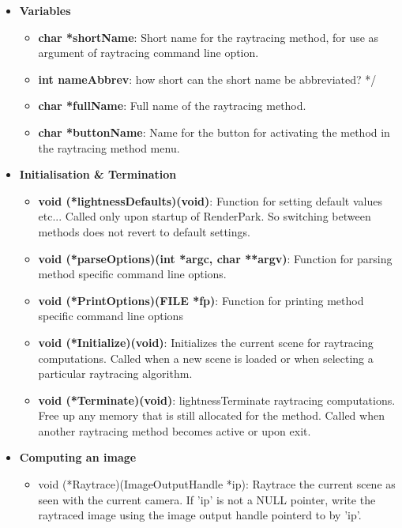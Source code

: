 \documentclass[11pt]{report}
\begin{document}
\begin{itemize}

\item{\bf Variables}
\begin{itemize}
\item {\bf char *shortName}: Short name for the raytracing method, for use 
	as argument of raytracing command line option.

\item {\bf int nameAbbrev}:  how short can the short name be abbreviated? */

\item {\bf char *fullName}:  Full name of the raytracing method.

\item {\bf char *buttonName}: Name for the button for activating the method 
	in the raytracing method menu.
\end{itemize}

\item{\bf Initialisation \& Termination}
\begin{itemize}
\item {\bf void (*lightnessDefaults)(void)}: Function for setting default values etc...
	Called only upon startup of RenderPark. So switching between methods
	does not revert to default settings.

\item {\bf void (*parseOptions)(int *argc, char **argv)}: Function for parsing
	method specific command line options.

\item {\bf void (*PrintOptions)(FILE *fp)}: Function for printing method 
	specific command line options

\item {\bf void (*Initialize)(void)}: Initializes the current scene for 
	raytracing computations.  Called when a new scene is loaded or
	when selecting a particular raytracing algorithm.

\item{\bf void (*Terminate)(void)}: lightnessTerminate raytracing computations. Free up any
	memory that is still allocated for the method. Called when another
	raytracing method becomes active or upon exit.
\end{itemize}


\item{\bf Computing an image}
\begin{itemize}

\item {void (*Raytrace)(ImageOutputHandle *ip)}: Raytrace the current 
	scene as seen with the current camera. If 'ip' is not a NULL
	pointer, write the raytraced image using the image output
	handle pointerd to by 'ip'.


\end{itemize}
\end{itemize}
\end{document}
